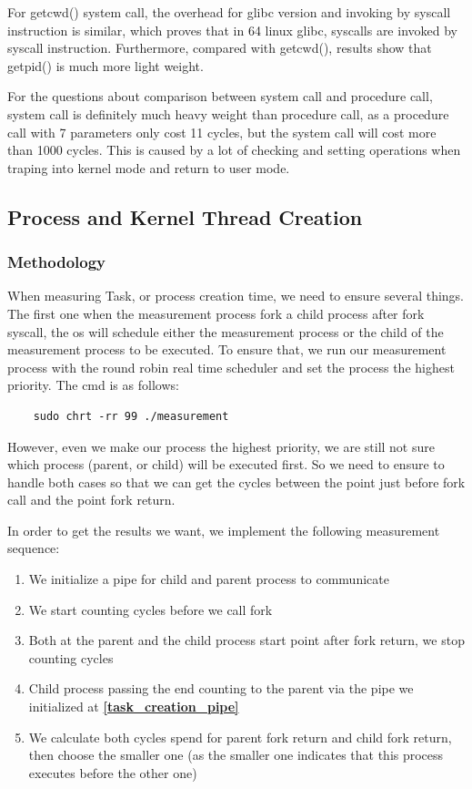 For getcwd() system call, the overhead for glibc version and invoking by syscall instruction is similar, which proves that in 64 linux glibc, syscalls are invoked by syscall instruction. Furthermore, compared with getcwd(), results show that getpid() is much more light weight.

For the questions about comparison between system call and procedure call, system call is definitely much heavy weight than procedure call, as a procedure call with 7 parameters only cost 11 cycles, but the system call will cost more than 1000 cycles. This is caused by a lot of checking and setting operations when traping into kernel mode and return to user mode.

\subsection{Process and Kernel Thread Creation}

\subsubsection{Methodology}
\label {creation_methodology}

When measuring Task, or process creation time, we need to ensure several things. The first one when the measurement process fork a child process after fork syscall, the os will schedule either the measurement process or the child of the measurement process to be executed. To ensure that, we run our measurement process with the round robin real time scheduler and set the process the highest priority. The cmd is as follows:

\begin{lstlisting}
    sudo chrt -rr 99 ./measurement
\end{lstlisting}

However, even we make our process the highest priority,  we are still not sure which process (parent, or child) will be executed first. So we need to ensure to handle both cases so that we can get the cycles between the point just before fork call and the point fork return.

In order to get the results we want, we implement the following measurement sequence:

\begin{enumerate}
    \item We initialize a pipe for child and parent process to communicate \label{task_creation_pipe}
    \item We start counting cycles before we call fork
    \item Both at the parent and the child process start point after fork return, we stop counting cycles
    \item Child process passing the end counting to the parent via the pipe we initialized at \textbf{\ref{task_creation_pipe}}
    \item We calculate both cycles spend for parent fork return and child fork return, then choose the smaller one (as the smaller one indicates that this process executes before the other one)
\end{enumerate}

